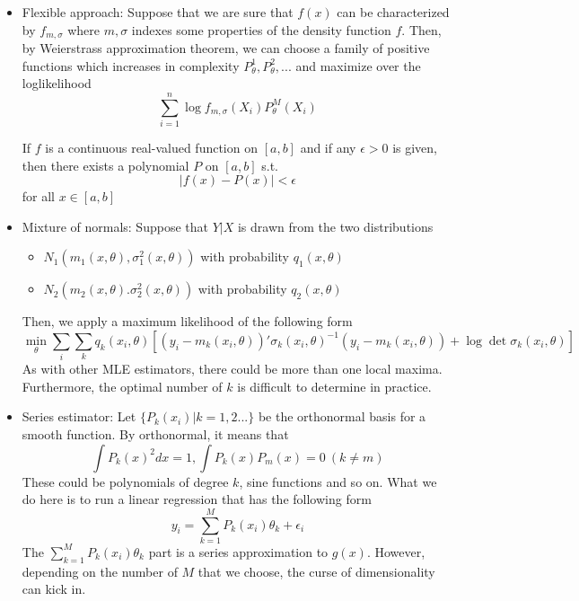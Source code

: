 \begin{itemize}
\item Flexible approach: Suppose that we are sure that $f(x)$ can be characterized by $f_{m,\sigma}$ where $m,\sigma$ indexes some properties of the density function $f$. Then, by Weierstrass approximation theorem, we can choose a family of positive functions which increases in complexity $P_\theta^1, P_\theta^2,...$ and maximize over the loglikelihood
\[
\sum_{i=1}^n \log{f_{m,\sigma}(X_i)}P_\theta^M(X_i)
\]
\begin{mdframed}[backgroundcolor=green!5] 
\begin{theorem}  If $f$ is a continuous real-valued function on $[a,b]$ and if any $\epsilon>0$ is given, then there exists a polynomial $P$ on $[a,b]$ s.t. 
\[
|f(x)-P(x)|<\epsilon
\]
for all $x\in[a,b]$
\end{theorem}
\end{mdframed}
\item Mixture of normals: Suppose that $Y|X$ is drawn from the two distributions
\begin{itemize}
\item $N_1(m_1(x,\theta), \sigma_1^2(x,\theta))$ with probability $q_1(x,\theta)$
\item $N_2(m_2(x,\theta). \sigma_2^2(x,\theta))$ with probability $q_2(x,\theta)$
\end{itemize}
Then, we apply a maximum likelihood of the following form
\[
\min_\theta \sum_i\sum_k q_k(x_i,\theta)[(y_i-m_k(x_i,\theta))'\sigma_k(x_i,\theta)^{-1}(y_i-m_k(x_i,\theta))+\log\det{\sigma_k(x_i,\theta)}]
\]
As with other MLE estimators, there could be more than one local maxima. Furthermore, the optimal number of $k$ is difficult to determine in practice.
\item Series estimator: Let $\{P_k(x_i)|k=1,2...\}$ be the orthonormal basis for a smooth function. By orthonormal, it means that
\[
\int P_k(x)^2 dx=1, \int P_k(x) P_m(x)=0 \ (k\neq m)
\]
 These could be polynomials of degree $k$, sine functions and so on. What we do here is to run a linear regression that has the following form
\[
y_i = \sum_{k=1}^MP_k(x_i)\theta_k+\epsilon_i
\]
The $\sum_{k=1}^MP_k(x_i)\theta_k$ part is a series approximation to $g(x)$. However, depending on the number of $M$ that we choose, the curse of dimensionality can kick in. 
\end{itemize}


